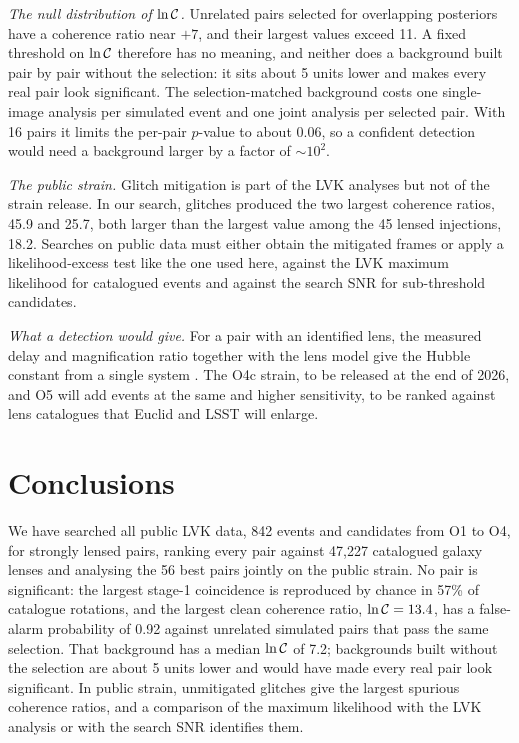 \emph{The null distribution of $\ln\mathcal C$.} Unrelated pairs selected for overlapping posteriors have a coherence ratio near $+7$, and their largest values exceed 11. A fixed threshold on $\ln\mathcal C$ therefore has no meaning, and neither does a background built pair by pair without the selection: it sits about 5 units lower and makes every real pair look significant. The selection-matched background costs one single-image analysis per simulated event and one joint analysis per selected pair. With 16 pairs it limits the per-pair $p$-value to about 0.06, so a confident detection would need a background larger by a factor of $\sim10^2$.

\emph{The public strain.} Glitch mitigation is part of the LVK analyses but not of the strain release. In our search, glitches produced the two largest coherence ratios, 45.9 and 25.7, both larger than the largest value among the 45 lensed injections, 18.2. Searches on public data must either obtain the mitigated frames or apply a likelihood-excess test like the one used here, against the LVK maximum likelihood for catalogued events and against the search SNR for sub-threshold candidates.

\emph{What a detection would give.} For a pair with an identified lens, the measured delay and magnification ratio together with the lens model give the Hubble constant from a single system \citep{paper2}. The O4c strain, to be released at the end of 2026, and O5 will add events at the same and higher sensitivity, to be ranked against lens catalogues that Euclid and LSST will enlarge.

\section{Conclusions}
We have searched all public LVK data, 842 events and candidates from O1 to O4, for strongly lensed pairs, ranking every pair against 47,227 catalogued galaxy lenses and analysing the 56 best pairs jointly on the public strain. No pair is significant: the largest stage-1 coincidence is reproduced by chance in 57\% of catalogue rotations, and the largest clean coherence ratio, $\ln\mathcal C=13.4$, has a false-alarm probability of 0.92 against unrelated simulated pairs that pass the same selection. That background has a median $\ln\mathcal C$ of 7.2; backgrounds built without the selection are about 5 units lower and would have made every real pair look significant. In public strain, unmitigated glitches give the largest spurious coherence ratios, and a comparison of the maximum likelihood with the LVK analysis or with the search SNR identifies them.
